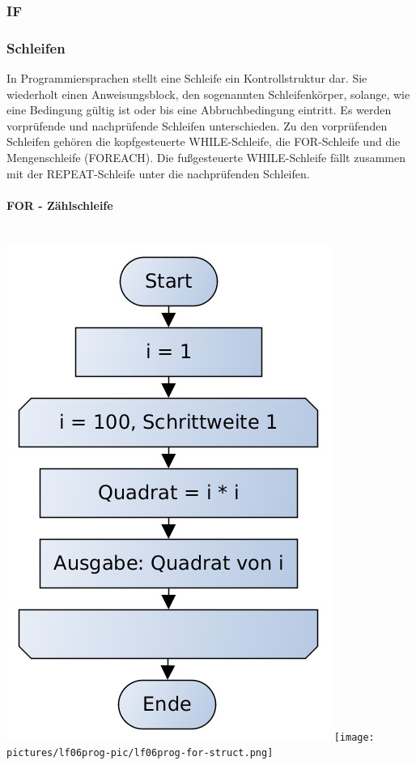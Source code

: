 \subsubsection{IF}

\subsubsection{Schleifen}

In Programmiersprachen stellt eine Schleife ein Kontrollstruktur dar. Sie wiederholt einen Anweisungsblock, den sogenannten Schleifenkörper, solange, wie eine Bedingung gültig ist oder bis eine Abbruchbedingung eintritt. Es werden vorprüfende und nachprüfende Schleifen unterschieden. Zu den vorprüfenden Schleifen gehören die kopfgesteuerte WHILE-Schleife, die FOR-Schleife und die Mengenschleife (FOREACH). Die fußgesteuerte WHILE-Schleife fällt zusammen mit der REPEAT-Schleife unter die nachprüfenden Schleifen.

\paragraph{FOR - Zählschleife}~\\

\includegraphics[scale=0.4]{pictures/lf06prog-pic/lf06prog-for-pap.png}
\texttt{[image: pictures/lf06prog-pic/lf06prog-for-struct.png]}

